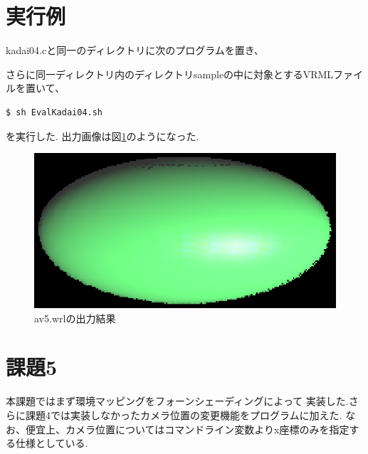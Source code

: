 \documentclass[a4j,dvipdfmx]{jsarticle}
\begin{document}
\section{実行例}
kadai04.cと同一のディレクトリに次のプログラムを置き、

さらに同一ディレクトリ内のディレクトリsampleの中に対象とするVRMLファイルを置いて、
\begin{lstlisting}
$ sh EvalKadai04.sh
\end{lstlisting}
を実行した.
出力画像は図\ref{fig:k4-av5}のようになった.
\begin{figure}[hp]
  \begin{center}
    \includegraphics[clip,scale=0.5]{images/Kadai04ForAv5.eps}
    \caption{av5.wrlの出力結果}
    \label{fig:k4-av5}
  \end{center}
\end{figure}

\section{課題5}
本課題ではまず環境マッピングをフォーンシェーディングによって
実装した.さらに課題4では実装しなかったカメラ位置の変更機能をプログラムに加えた.
なお、便宜上、カメラ位置についてはコマンドライン変数よりx座標のみを指定する仕様としている.
\end{document}

